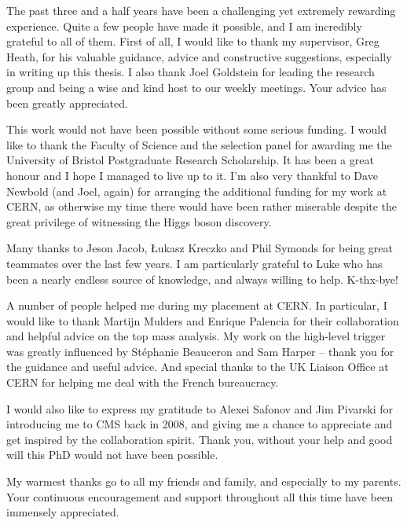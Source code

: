 


\begin{acknowledgements}
The past three and a half years have been a challenging yet extremely rewarding experience. Quite a few people have made
it possible, and I am incredibly grateful to all of them. First of all, I would like to thank my supervisor, Greg Heath,
for his valuable guidance, advice and constructive suggestions, especially in writing up this thesis. I also thank Joel
Goldstein for leading the research group and being a wise and kind host to our weekly meetings. Your advice has been
greatly appreciated.

This work would not have been possible without some serious funding. I would like to thank the Faculty of Science and
the selection panel for awarding me the University of Bristol Postgraduate Research Scholarship. It has been a great
honour and I hope I managed to live up to it. I'm also very thankful to Dave Newbold (and Joel, again) for arranging the
additional funding for my work at CERN, as otherwise my time there would have been rather miserable despite the great
privilege of witnessing the Higgs boson discovery.

Many thanks to Jeson Jacob, \L{}ukasz Kreczko and Phil Symonds for being great teammates over the last few years. I am
particularly grateful to Luke who has been a nearly endless source of knowledge, and always willing to help. K-thx-bye!

A number of people helped me during my placement at CERN. In particular, I would like to thank Martijn Mulders and
Enrique Palencia for their collaboration and helpful advice on the top mass analysis. My work on the high-level trigger
was greatly influenced by St\'{e}phanie Beauceron and Sam Harper -- thank you for the guidance and useful advice. And
special thanks to the UK Liaison Office at CERN for helping me deal with the French bureaucracy.

I would also like to express my gratitude to Alexei Safonov and Jim Pivarski for introducing me to CMS back in 2008, and
giving me a chance to appreciate and get inspired by the collaboration spirit. Thank you, without your help and good
will this PhD would not have been possible.

My warmest thanks go to all my friends and family, and especially to my parents. Your continuous encouragement and
support throughout all this time have been immensely appreciated.

\end{acknowledgements}


